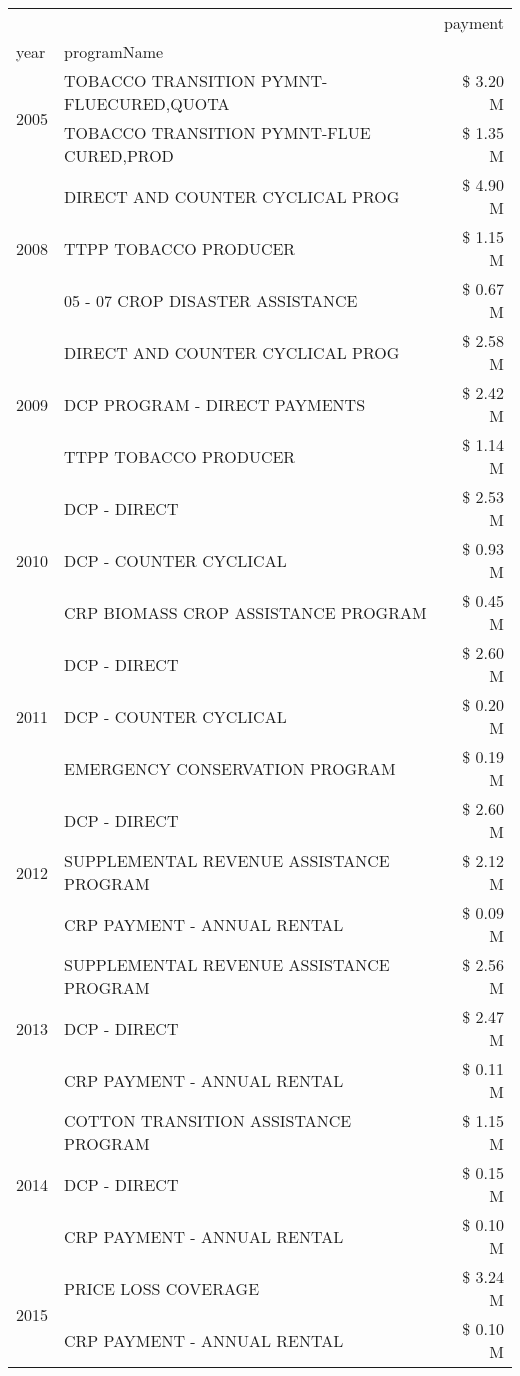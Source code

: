 \begin{tabular}{llr}
\toprule
 &  & payment \\
year & programName &  \\
\midrule
\multirow[t]{2}{*}{2005} & TOBACCO TRANSITION PYMNT-FLUECURED,QUOTA & \$ 3.20 M \\
 & TOBACCO TRANSITION PYMNT-FLUE CURED,PROD & \$ 1.35 M \\
\cline{1-3}
\multirow[t]{3}{*}{2008} & DIRECT AND COUNTER CYCLICAL PROG & \$ 4.90 M \\
 & TTPP TOBACCO PRODUCER & \$ 1.15 M \\
 & 05 - 07 CROP DISASTER ASSISTANCE & \$ 0.67 M \\
\cline{1-3}
\multirow[t]{3}{*}{2009} & DIRECT AND COUNTER CYCLICAL PROG & \$ 2.58 M \\
 & DCP PROGRAM - DIRECT PAYMENTS & \$ 2.42 M \\
 & TTPP TOBACCO PRODUCER & \$ 1.14 M \\
\cline{1-3}
\multirow[t]{3}{*}{2010} & DCP - DIRECT & \$ 2.53 M \\
 & DCP - COUNTER CYCLICAL & \$ 0.93 M \\
 & CRP BIOMASS CROP ASSISTANCE PROGRAM & \$ 0.45 M \\
\cline{1-3}
\multirow[t]{3}{*}{2011} & DCP - DIRECT & \$ 2.60 M \\
 & DCP - COUNTER CYCLICAL & \$ 0.20 M \\
 & EMERGENCY CONSERVATION PROGRAM & \$ 0.19 M \\
\cline{1-3}
\multirow[t]{3}{*}{2012} & DCP - DIRECT & \$ 2.60 M \\
 & SUPPLEMENTAL REVENUE ASSISTANCE PROGRAM & \$ 2.12 M \\
 & CRP PAYMENT - ANNUAL RENTAL & \$ 0.09 M \\
\cline{1-3}
\multirow[t]{3}{*}{2013} & SUPPLEMENTAL REVENUE ASSISTANCE PROGRAM & \$ 2.56 M \\
 & DCP - DIRECT & \$ 2.47 M \\
 & CRP PAYMENT - ANNUAL RENTAL & \$ 0.11 M \\
\cline{1-3}
\multirow[t]{3}{*}{2014} & COTTON TRANSITION ASSISTANCE PROGRAM & \$ 1.15 M \\
 & DCP - DIRECT & \$ 0.15 M \\
 & CRP PAYMENT - ANNUAL RENTAL & \$ 0.10 M \\
\cline{1-3}
\multirow[t]{3}{*}{2015} & PRICE LOSS COVERAGE & \$ 3.24 M \\
 & CRP PAYMENT - ANNUAL RENTAL & \$ 0.10 M \\

\end{tabular}
